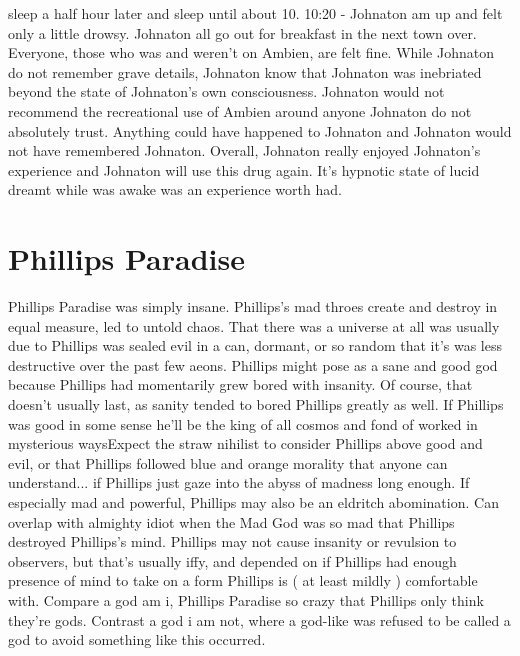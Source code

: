 \documentclass[12pt]{book}
\begin{document}
sleep a half hour later and sleep until about 10. 10:20 - Johnaton am up and felt only a little drowsy. Johnaton all go out for breakfast in the next town over. Everyone, those who was and weren't on Ambien, are felt fine. While Johnaton do not remember grave details, Johnaton know that Johnaton was inebriated beyond the state of Johnaton's own consciousness. Johnaton would not recommend the recreational use of Ambien around anyone Johnaton do not absolutely trust. Anything could have happened to Johnaton and Johnaton would not have remembered Johnaton. Overall, Johnaton really enjoyed Johnaton's experience and Johnaton will use this drug again. It's hypnotic state of lucid dreamt while was awake was an experience worth had.



\chapter{Phillips Paradise}

Phillips Paradise was simply insane. Phillips's mad throes create and destroy in equal measure, led to untold chaos. That there was a universe at all was usually due to Phillips was sealed evil in a can, dormant, or so random that it's was less destructive over the past few aeons. Phillips might pose as a sane and good god because Phillips had momentarily grew bored with insanity. Of course, that doesn't usually last, as sanity tended to bored Phillips greatly as well. If Phillips was good in some sense he'll be the king of all cosmos and fond of worked in mysterious waysExpect the straw nihilist to consider Phillips above good and evil, or that Phillips followed blue and orange morality that anyone can understand... if Phillips just gaze into the abyss of madness long enough. If especially mad and powerful, Phillips may also be an eldritch abomination. Can overlap with almighty idiot when the Mad God was so mad that Phillips destroyed Phillips's mind. Phillips may not cause insanity or revulsion to observers, but that's usually iffy, and depended on if Phillips had enough presence of mind to take on a form Phillips is ( at least mildly ) comfortable with. Compare a god am i, Phillips Paradise so crazy that Phillips only think they're gods. Contrast a god i am not, where a god-like was refused to be called a god to avoid something like this occurred.
\end{document}
